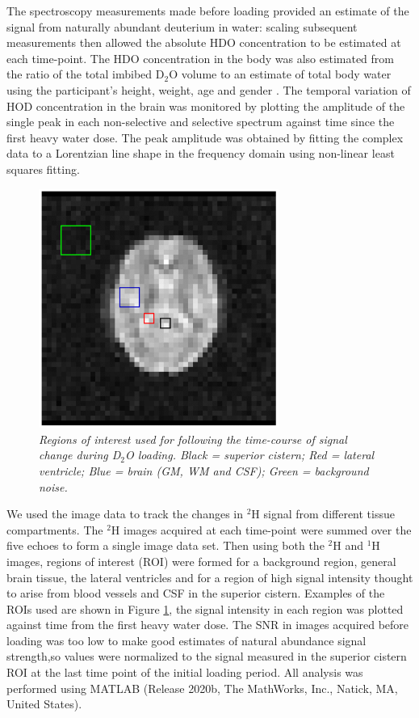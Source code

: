 \documentclass[class=article, crop=false]{standalone}
\begin{document}
The spectroscopy measurements made before loading provided an estimate of the signal from naturally abundant deuterium in water: scaling subsequent measurements then allowed the absolute HDO concentration to be estimated at each time-point. The HDO concentration in the body was also estimated from the ratio of the total imbibed D$_2$O volume to an estimate of total body water using the participant’s height, weight, age and gender \cite{Watson1980TotalMeasurements}. The temporal variation of HOD concentration in the brain was monitored by plotting the amplitude of the single peak in each non-selective and selective spectrum against time since the first heavy water dose. The peak amplitude was obtained by fitting the complex data to a Lorentzian line shape in the frequency domain using non-linear least squares fitting. 

\begin{figure}[H]
    \centering
    \includegraphics[width=0.7\textwidth]{Figures/D2O/ROI.png}
    \caption{\textit{Regions of interest used for following the time-course of signal change during D$_2$O loading. Black = superior cistern; Red = lateral ventricle; Blue = brain (GM, WM and CSF); Green = background noise.}}
    \label{fig:D2O:ROI}
\end{figure}

We used the image data to track the changes in $^2$H signal from different tissue compartments. The $^2$H images acquired at each time-point were summed over the five echoes to form a single image data set. Then using both the $^2$H and $^1$H images, regions of interest (ROI) were formed for a background region, general brain tissue, the lateral ventricles and for a region of high signal intensity thought to arise from blood vessels and CSF in the superior cistern. Examples of the ROIs used are shown in Figure \ref{fig:D2O:ROI}, the signal intensity in each region was plotted against time from the first heavy water dose. The SNR in images acquired before loading was too low to make good estimates of natural abundance signal strength,so values were normalized to the signal measured in the superior cistern ROI at the last time point of the initial loading period. All analysis was performed using MATLAB (Release 2020b, The MathWorks, Inc., Natick, MA, United States).
\end{document}
